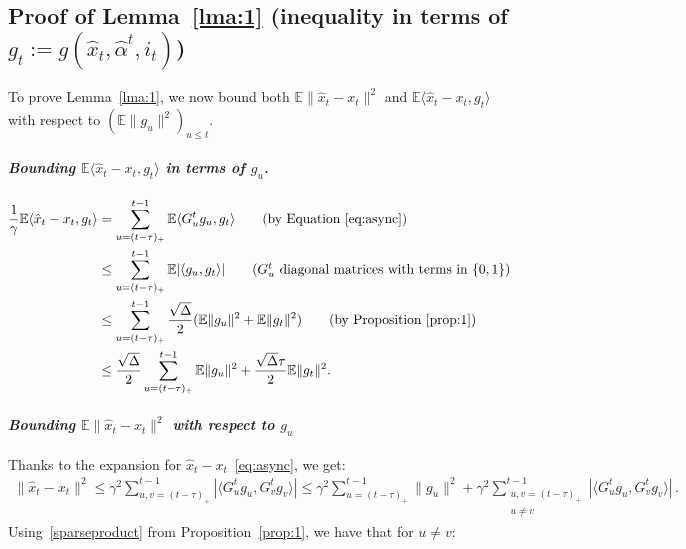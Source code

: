 \documentclass[twoside, 11pt]{article}
\newcommand{\stepsize}{\gamma}
\newcommand{\overlap}{\tau}
\newcommand{\sparsity}{\Delta}
\newcommand{\E}{\mathbb{E}}
\begin{document}
\subsection{Proof of Lemma~\ref{lma:1} (inequality in terms of $g_t := g(\hat x_{t}, \hat \alpha^t, i_{t})$)} \label{apxB:lma1}
To prove Lemma~\ref{lma:1}, we now bound both $\E\|\hat x_t - x_t\|^2$ and $\E\langle \hat x_t -x_t,  g_t\rangle$ with respect to $(\E\|g_u\|^2)_{u\leq t}$.

\paragraph{\textit{Bounding $\E\langle \hat x_t -x_t,  g_t\rangle$ in terms of $g_u$.}}
\begin{align}
\frac{1}{\stepsize} \E\langle \hat x_t - x_t, g_t \rangle
&= \sum_{u=(t - \overlap)_+}^{t-1} \E \langle G_u^t g_u, g_t \rangle
\tag*{(by Equation~\eqref{eq:async})} \nonumber \\
&\leq \sum_{u=(t - \overlap)_+}^{t-1} \E | \langle g_u, g_t \rangle |
\tag*{($G_u^t$ diagonal matrices with terms in $\{0, 1\}$)}\nonumber \\
&\leq \sum_{u=(t - \overlap)_+}^{t-1} \frac{\sqrt{\sparsity}}{2}(\E\|g_{u}\|^2 + \E\|g_{t}\|^2)
\tag*{(by Proposition~\ref{prop:1})}\nonumber \\
&\leq \frac{\sqrt{\sparsity}}{2} \sum_{u=(t - \overlap)_+}^{t-1}\E\|g_{u}\|^2 + \frac{\sqrt{\sparsity}\overlap}{2}\E\|g_{t}\|^2 .
\end{align}

\paragraph{\textit{Bounding $\E\|\hat x_t - x_t\|^2$ with respect to $g_u$}}
Thanks to the expansion for $\hat x_t - x_t$~\eqref{eq:async}, we get:
\begin{align*}
\|\hat x_t - x_t\|^2
\leq \stepsize^2 \sum_{u, v=(t -\overlap)_+}^{t-1}|\langle G_u^t g_{u}, G_v^t g_{v}\rangle |
\leq \stepsize^2 \sum_{u=(t -\overlap)_+}^{t-1}\|g_{u}\|^2
	+ \stepsize^2 \sum_{\substack{u, v=(t-\overlap)_+ \\u\neq v}}^{t-1} |\langle G_u^t g_{u}, G_v^t g_{v}\rangle |  \, .
\end{align*}
Using~\eqref{sparseproduct} from Proposition~\ref{prop:1}, we have that for $u \neq v$:
\end{document}

